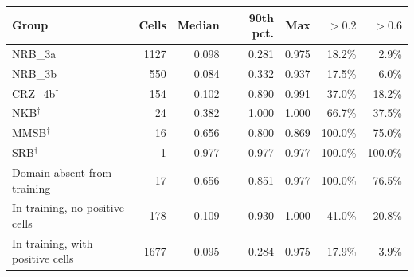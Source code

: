 \begin{tabular}{lrrrrrr}
\toprule
Group & Cells & Median & 90th pct. & Max & $>0.2$ & $>0.6$ \\
\midrule
NRB\_3a & 1127 & 0.098 & 0.281 & 0.975 & 18.2\% & 2.9\% \\
NRB\_3b & 550 & 0.084 & 0.332 & 0.937 & 17.5\% & 6.0\% \\
CRZ\_4b$^{\dagger}$ & 154 & 0.102 & 0.890 & 0.991 & 37.0\% & 18.2\% \\
NKB$^{\dagger}$ & 24 & 0.382 & 1.000 & 1.000 & 66.7\% & 37.5\% \\
MMSB$^{\dagger}$ & 16 & 0.656 & 0.800 & 0.869 & 100.0\% & 75.0\% \\
SRB$^{\dagger}$ & 1 & 0.977 & 0.977 & 0.977 & 100.0\% & 100.0\% \\
\midrule
Domain absent from training & 17 & 0.656 & 0.851 & 0.977 & 100.0\% & 76.5\% \\
In training, no positive cells & 178 & 0.109 & 0.930 & 1.000 & 41.0\% & 20.8\% \\
In training, with positive cells & 1677 & 0.095 & 0.284 & 0.975 & 17.9\% & 3.9\% \\
\bottomrule
\end{tabular}
